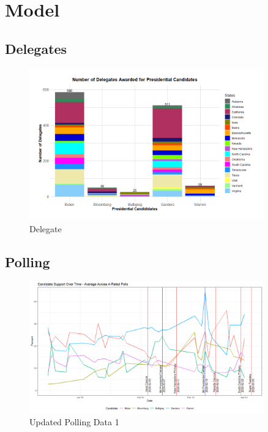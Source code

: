 \section{Model}\label{model}

\subsection{Delegates}

\begin{figure}[H]
    \centering
    \includegraphics[width=0.9\textwidth]{figures/Delegate.png}
    \caption{Delegate}
    \label{Delegate}
\end{figure}

\subsection{Polling}

\begin{figure}[H]
    \centering
    \includegraphics[width=0.9\textwidth]{figures/long-A-rated-polls.png}
    \caption{Updated Polling Data 1 }
    \label{Updated-Polling-Data-1}
\end{figure}

